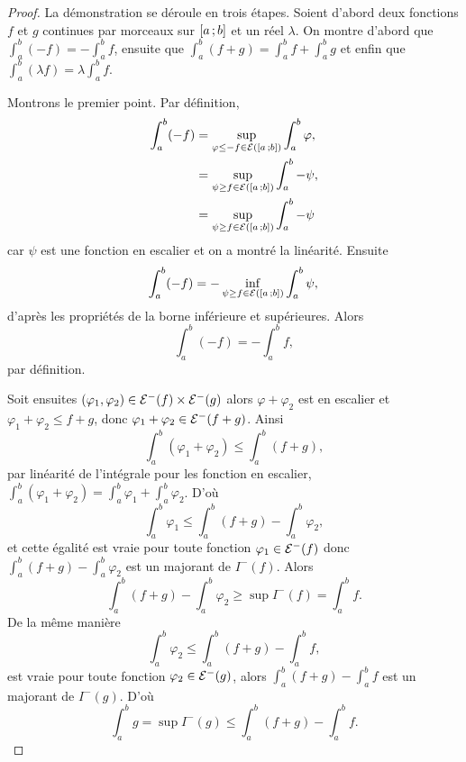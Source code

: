 \begin{proof}
  La démonstration se déroule en trois étapes. Soient d'abord deux fonctions $f$ et $g$ continues par morceaux sur $\left[ a \, ;  b \right]$ et un réel $\lambda$. On montre d'abord que $\int_a^b (-f) = -\int_a^b f$, ensuite que $\int_a^b (f+g) = \int_a^b f + \int_a^b g$ et enfin que $\int_a^b (\lambda f) = \lambda \int_a^b f$.

Montrons le premier point. Par définition,
\begin{align}
  \int_a^b (-f) &= \sup\limits_{\varphi \leq -f \in \mathcal{E}(\left[ a \, ;  b \right])} \int_a^b \varphi ,\\
  &= \sup\limits_{\psi \geq f \in \mathcal{E}(\left[ a \, ;  b \right])} \int_a^b -\psi ,\\
  &= \sup\limits_{\psi \geq f \in \mathcal{E}(\left[ a \, ;  b \right])} \int_a^b -\psi 
\end{align}
car $\psi$ est une fonction en escalier et on a montré la linéarité. Ensuite
\begin{equation}
  \int_a^b (-f) = -\inf\limits_{\psi \geq f \in \mathcal{E}(\left[ a \, ;  b \right])} \int_a^b \psi ,\\
\end{equation}
d'après les propriétés de la borne inférieure et supérieures. Alors
\begin{equation}
   \int_a^b (-f) = -\int_a^b f,
\end{equation}
par définition.

Soit ensuites $(\varphi_1, \varphi_2) \in \mathcal{E}^{-}(f) \times \mathcal{E}^{-}(g)$ alors $\varphi+\varphi_2$ est en escalier et $\varphi_1+\varphi_2 \leq f+g$, donc $\varphi_1+\varphi_2 \in \mathcal{E}^{-}(f+g)$. Ainsi
\begin{equation}
  \int_a^b (\varphi_1+\varphi_2) \leq \int_a^b (f+g),
\end{equation}
par linéarité de l'intégrale pour les fonction en escalier, $\int_a^b (\varphi_1+\varphi_2) = \int_a^b \varphi_1 + \int_a^b \varphi_2$. D'où
\begin{equation}
  \int_a^b \varphi_1 \leq \int_a^b (f+g) - \int_a^b \varphi_2,
\end{equation}
et cette égalité est vraie pour toute fonction $\varphi_1 \in \mathcal{E}^{-}(f)$ donc $\int_a^b (f+g) - \int_a^b \varphi_2$ est un majorant de $I^{-}(f)$. Alors
\begin{equation}
  \int_a^b (f+g) - \int_a^b \varphi_2 \geq \sup I^{-}(f) = \int_a^b f.
\end{equation}
De la même manière
\begin{equation}
  \int_a^b \varphi_2 \leq \int_a^b (f+g) - \int_a^b f,
\end{equation}
est vraie pour toute fonction $\varphi_2 \in \mathcal{E}^{-}(g)$, alors $\int_a^b (f+g) - \int_a^b f$ est un majorant de $I^{-}(g)$. D'où
\begin{equation}
  \int_a^b g = \sup I^{-}(g) \leq \int_a^b (f+g) - \int_a^b f.
\end{equation}


\end{proof}
